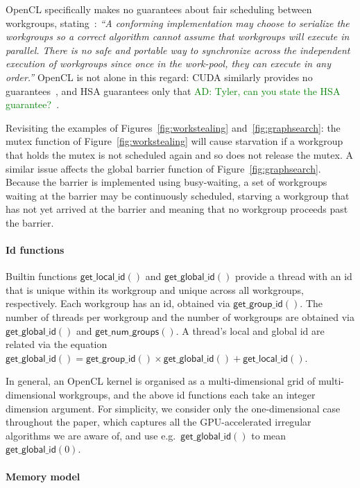 \documentclass[nocopyrightspace]{sigplanconf-pldi16}
\newcommand{\ADComment}[1]{\textcolor{green}{AD: #1}}
\newcommand{\getgroupid}{\mathsf{get\_group\_id}}
\newcommand{\getnumgroups}{\mathsf{get\_num\_groups}}
\newcommand{\getlocalid}{\mathsf{get\_local\_id}}
\newcommand{\getglobalid}{\mathsf{get\_global\_id}}
\newcommand{\getlocalsize}{\mathsf{get\_global\_id}}
\begin{document}
OpenCL specifically makes no guarantees about fair scheduling between
workgroups, stating~\cite{...}: \emph{``A conforming implementation
  may choose to serialize the workgroups so a correct algorithm cannot
  assume that workgroups will execute in parallel.  There is no safe
  and portable way to synchronize across the independent execution of
  workgroups since once in the work-pool, they can execute in any
  order.''}  OpenCL is not alone in this regard: CUDA similarly
provides no guarantees~\cite{...}, and HSA guarantees only that
\ADComment{Tyler, can you state the HSA guarantee?}~\cite{...}.

Revisiting the examples of Figures~\ref{fig:workstealing}
and~\ref{fig:graphsearch}: the mutex function of
Figure~\ref{fig:workstealing} will cause starvation if a workgroup
that holds the mutex is not scheduled again and so does not release
the mutex.  A similar issue affects the global barrier function of
Figure~\ref{fig:graphsearch}.  Because the barrier is implemented
using busy-waiting, a set of workgroups waiting at the barrier may be
continuously scheduled, starving a workgroup that has not yet arrived
at the barrier and meaning that no workgroup proceeds past the
barrier.

\paragraph{Id functions}

Builtin functions $\getlocalid()$ and $\getglobalid()$ provide a
thread with an id that is unique within its workgroup and unique
across all workgroups, respectively.  Each workgroup has an id,
obtained via $\getgroupid()$.  The number of threads per workgroup and
the number of workgroups are obtained via $\getlocalsize()$ and
$\getnumgroups()$.  A thread's local and global id are related via the
equation $\getglobalid() = \getgroupid() \times \getlocalsize() +
\getlocalid()$.

In general, an OpenCL kernel is organised as a multi-dimensional grid
of multi-dimensional workgroups, and the above id functions each take
an integer dimension argument.  For simplicity, we consider only the
one-dimensional case throughout the paper, which captures all the
GPU-accelerated irregular algorithms we are aware of, and use
e.g.\ $\getglobalid()$ to mean $\getglobalid(0)$.


\paragraph{Memory model}
\end{document}
